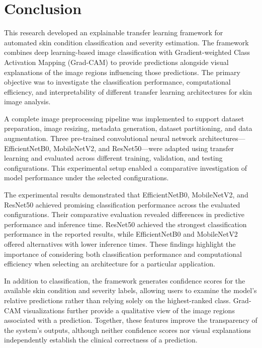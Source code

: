 \section{Conclusion}

This research developed an explainable transfer learning framework for automated skin condition classification and severity estimation. The framework combines deep learning-based image classification with Gradient-weighted Class Activation Mapping (Grad-CAM) to provide predictions alongside visual explanations of the image regions influencing those predictions. The primary objective was to investigate the classification performance, computational efficiency, and interpretability of different transfer learning architectures for skin image analysis.

A complete image preprocessing pipeline was implemented to support dataset preparation, image resizing, metadata generation, dataset partitioning, and data augmentation. Three pre-trained convolutional neural network architectures—EfficientNetB0, MobileNetV2, and ResNet50—were adapted using transfer learning and evaluated across different training, validation, and testing configurations. This experimental setup enabled a comparative investigation of model performance under the selected configurations.

The experimental results demonstrated that EfficientNetB0, MobileNetV2, and ResNet50 achieved promising classification performance across the evaluated configurations. Their comparative evaluation revealed differences in predictive performance and inference time. ResNet50 achieved the strongest classification performance in the reported results, while EfficientNetB0 and MobileNetV2 offered alternatives with lower inference times. These findings highlight the importance of considering both classification performance and computational efficiency when selecting an architecture for a particular application.

In addition to classification, the framework generates confidence scores for the available skin condition and severity labels, allowing users to examine the model's relative predictions rather than relying solely on the highest-ranked class. Grad-CAM visualizations further provide a qualitative view of the image regions associated with a prediction. Together, these features improve the transparency of the system's outputs, although neither confidence scores nor visual explanations independently establish the clinical correctness of a prediction.

